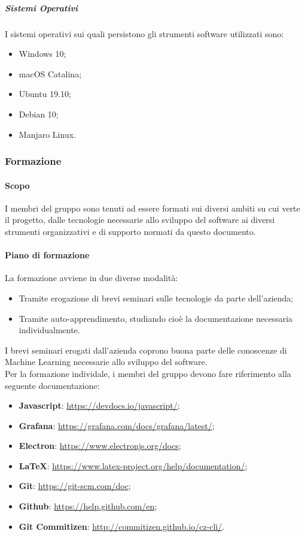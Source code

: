 \documentclass[../norme-di-progetto.tex]{subfiles}
\begin{document}
\subparagraph{Sistemi Operativi}
I sistemi operativi sui quali persistono gli strumenti software utilizzati sono:
\begin{itemize}
  \item Windows 10;
  \item macOS Catalina;
  \item Ubuntu 19.10;
  \item Debian 10;
  \item Manjaro Linux.
\end{itemize}

\subsubsection{Formazione}
\paragraph{Scopo}
I membri del gruppo sono tenuti ad essere formati sui diversi ambiti su cui verte il progetto, dalle tecnologie necessarie allo sviluppo del software ai diversi strumenti organizzativi e di supporto normati da questo documento. \\
\paragraph{Piano di formazione}
La formazione avviene in due diverse modalità:
\begin{itemize}
  \item Tramite erogazione di brevi seminari sulle tecnologie da parte dell'azienda;
  \item Tramite auto-apprendimento, studiando cioè la documentazione necessaria individualmente.
\end{itemize}
I brevi seminari erogati dall'azienda coprono buona parte delle conoscenze di Machine Learning necessarie allo sviluppo del software. \\ Per la formazione individale, i membri del gruppo devono fare riferimento alla seguente documentazione:
\begin{itemize}
  \item \textbf{Javascript}: \href{https://devdocs.io/javascript/}{https://devdocs.io/javascript/};
  \item \textbf{Grafana}: \href{https://grafana.com/docs/grafana/latest/}{https://grafana.com/docs/grafana/latest/};
  \item \textbf{Electron}: \href{https://www.electronjs.org/docs}{https://www.electronjs.org/docs};
  \item \textbf{\LaTeX}: \href{https://www.latex-project.org/help/documentation/}{https://www.latex-project.org/help/documentation/};
  \item \textbf{Git}: \href{https://git-scm.com/doc}{https://git-scm.com/doc};
  \item \textbf{Github}: \href{https://help.github.com/en}{https://help.github.com/en};
  \item \textbf{Git Commitizen}: \href{http://commitizen.github.io/cz-cli/}{http://commitizen.github.io/cz-cli/}.
\end{itemize}
\end{document}
